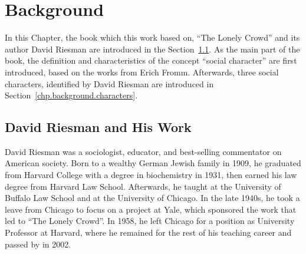 \chapter{Background}\label{chp.background}
In this Chapter, the book which this work based on, ``The Lonely Crowd'' and its author David Riesman are introduced in the Section~\ref{chp.background.david}. As the main part of the book, the definition and characteristics of the concept ``social character'' are first introduced, based on the works from Erich Fromm. Afterwards, three social characters, identified by David Riesman are introduced in Section~\ref{chp.background.characters}. 

\section{David Riesman and His Work}\label{chp.background.david}

David Riesman was a sociologist, educator, and best-selling commentator on American society. Born to a wealthy German Jewish family in 1909, he graduated from Harvard College with a degree in biochemistry in 1931, then earned his law degree from Harvard Law School. Afterwards, he taught at the University of Buffalo Law School and at the University of Chicago. In the late 1940s, he took a leave from Chicago to focus on a project at Yale, which sponsored the work that led to ``The Lonely Crowd''. In 1958, he left Chicago for a
position as University Professor at Harvard, where he
remained for the rest of his teaching career and passed by in 2002.


